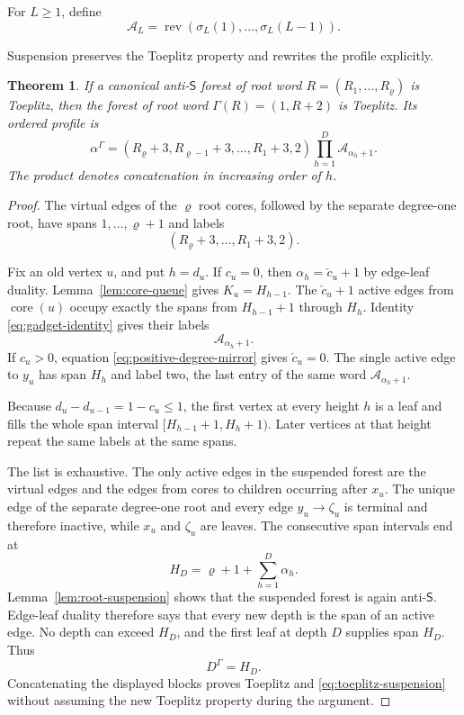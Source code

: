 \documentclass[11pt]{article}
\newtheorem{theorem}{Theorem}[section]
\theoremstyle{definition}
\theoremstyle{remark}
\DeclareMathOperator{\rev}{rev}
\begin{document}
For \(L\geq1\), define
\[
 \mathcal A_L=\rev(\sigma_L(1),\ldots,\sigma_L(L-1)).
\]

Suspension preserves the Toeplitz property and rewrites the profile explicitly.
\begin{theorem}
\label{thm:toeplitz-suspension}
If a canonical anti-\(\mathsf S\) forest of root word
\(R=(R_1,\ldots,R_{\varrho})\) is Toeplitz, then the forest of root word
\(\Gamma(R)=(1,R+2)\) is Toeplitz.  Its ordered profile is
\begin{equation}
\label{eq:toeplitz-suspension}
 \alpha^{\Gamma}
 =(R_{\varrho}+3,R_{\varrho-1}+3,\ldots,R_1+3,2)
 \prod_{h=1}^{D}\mathcal A_{\alpha_h+1}.
\end{equation}
The product denotes concatenation in increasing order of \(h\).
\end{theorem}

\begin{proof}
The virtual edges of the \(\varrho\) root cores, followed by the separate
degree-one root, have spans \(1,\ldots,\varrho+1\) and labels
\[
 (R_{\varrho}+3,\ldots,R_1+3,2).
\]

Fix an old vertex \(u\), and put \(h=d_u\).  If \(c_u=0\), then
\(\alpha_h=\check c_u+1\) by edge-leaf duality.  Lemma~\ref{lem:core-queue} gives
\(K_u=H_{h-1}\).  The \(\check c_u+1\) active edges from \(\operatorname{core}(u)\) occupy exactly
the spans from \(H_{h-1}+1\) through \(H_h\).  Identity
\eqref{eq:gadget-identity} gives their labels
\[
 \mathcal A_{\alpha_h+1}.
\]
If \(c_u>0\), equation \eqref{eq:positive-degree-mirror} gives \(\check c_u=0\).
The single active edge to \(y_u\) has span \(H_h\) and label two, the last
entry of the same word \(\mathcal A_{\alpha_h+1}\).

Because \(d_u-d_{u-1}=1-c_u\leq1\), the first vertex at every height \(h\)
is a leaf and fills the whole span interval
\([H_{h-1}+1,H_h+1)\).  Later vertices at that height repeat the same labels
at the same spans.

The list is exhaustive.  The only active edges in the suspended forest are
the virtual edges and the edges from cores to children occurring after
\(x_u\).  The unique edge of the separate degree-one root and every edge
\(y_u\to \zeta_u\) is terminal and therefore inactive, while \(x_u\) and \(\zeta_u\)
are leaves.  The consecutive span intervals end at
\[
 H_D=\varrho+1+\sum_{h=1}^D\alpha_h.
\]
Lemma~\ref{lem:root-suspension} shows that the suspended forest is again
anti-\(\mathsf S\).  Edge-leaf duality therefore says that every new depth is
the span of an active edge.  No depth can exceed \(H_D\), and the first leaf
at depth \(D\) supplies span \(H_D\).  Thus
\[
 D^{\Gamma}=H_D.
\]
Concatenating the displayed blocks proves Toeplitz and
\eqref{eq:toeplitz-suspension} without assuming the new Toeplitz property
during the argument.
\end{proof}
\end{document}
